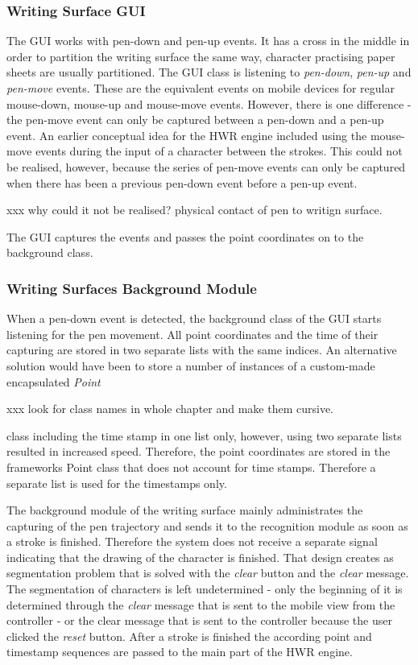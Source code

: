 \subsubsection{Writing Surface GUI}
\label{sec:hwre:writingsurfacegui}
The GUI works with pen-down and pen-up events. It has a cross in the middle in 
order to partition the writing surface the same way, character practising paper 
sheets are usually partitioned. The GUI class is listening to \emph{pen-down}, 
\emph{pen-up} and \emph{pen-move} events. These are the equivalent events on 
mobile devices for regular mouse-down, mouse-up and mouse-move events. 
However, there is one difference - the pen-move event can only be captured 
between a pen-down and a pen-up event. 
An earlier conceptual idea for the HWR engine included using the
mouse-move events during the input of a character between the strokes. This 
could not be realised, however, because the series of pen-move events can only 
be captured when there has been a previous pen-down event before a pen-up event. 

xxx
why could it not be realised?
physical contact of pen to writign surface.

The GUI captures the events and passes the point coordinates on to 
the background class.

\subsubsection{Writing Surfaces Background Module}
\label{sec:hwre:writingsurfacebackground}

When a pen-down event is detected, the background class of the GUI starts 
listening for the pen movement. All point coordinates and the time of their 
capturing are stored in two separate lists with the same indices.
An alternative solution would have been to store a number of instances of a 
custom-made encapsulated \emph{Point} 

xxx look for class names in whole chapter and make them cursive.


class including the time stamp in one 
list only, however, using two separate lists resulted in increased speed.
Therefore, the point coordinates are stored in the frameworks Point class that 
does not account for time stamps. Therefore a separate list is used for the 
timestamps only.

The background module of the writing surface mainly administrates the capturing 
of the pen trajectory and sends it to the recognition module as soon as a 
stroke is finished. Therefore the system does not receive a separate signal 
indicating that the drawing of the character is finished. That design creates 
as segmentation problem that is solved with the \emph{clear} button and the 
\emph{clear} message. The segmentation of characters is left undetermined - only 
the beginning of it is determined through the \emph{clear} message that is sent 
to the mobile view from the controller - or the clear message that is sent to 
the controller because the user clicked the \emph{reset} button.
After a stroke is finished the according point and timestamp sequences are 
passed to the main part of the HWR engine. 

